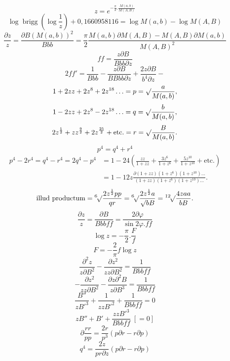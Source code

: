 \begin{equation*}\tag*{[2]}z=e^{-\frac\pi2.\frac{M(a,b)}{M(A,B)}}\end{equation*}
\begin{equation*}\tag*{[3]}
\log\operatorname{brigg}\left(\log\frac1z\right)+0{,}1660958116=\log M(a,b)-\log M(A,B)
\end{equation*}
{\small
\begin{equation*}\tag*{[4]}
\frac{\partial z}z=\frac{\partial B(M(a,b))^2}{Bbb}
=\frac\pi2\frac{M(a,b)\partial M(A,B)-M(A,B)\partial M(a,b)}{M(A,B)^2}
\end{equation*}}
\begin{equation*}\tag*{[5]}ff=\frac{z\partial B}{Bbb\partial z}\end{equation*}
\[2ff'=\frac1{Bbb}-\frac{z\partial B}{BBbb\partial z}+\frac{2z\partial B}{b^4\partial z}-\]
\[1+2zz+2z^8+2z^{18}\ldots=p=\surd\frac a{M(a,b)},\]
\[1-2zz+2z^8-2z^{18}\ldots=q=\surd\frac b{M(a,b)},\]
\[2z^{\frac12}+zz^{\frac92}+2z^{\frac{25}2}+\text{etc.}=r=\surd\frac B{M(a,b)}.\]
\[p^4=q^4+r^4\]
{\small
\[\begin{aligned}
p^4-2r^4=q^4-r^4=2q^4-p^4
&=1-24\left(\frac{zz}{1+zz}+\frac{3z^6}{1+z^6}+\frac{5z^{10}}{1+z^{10}}+\text{etc.}\right)\\
&=1-12z\frac{\partial(1+zz)(1+z^6)(1+z^{10})\ldots}{(1+zz)(1+z^6)(1+z^{10})\ldots}.
\end{aligned}\]}
\[\text{illud productum}={}^6\!\surd\frac{2z^{\frac12}pp}{qr}
={}^6\!\surd\frac{2z^{\frac12}a}{\surd bB}={} ^{12}\!\surd\frac{4zaa}{bB}.\]
\clearpage{}
\noindent [S.\ 12]
\begin{equation*}\tag*{[6]}\frac{\partial z}z=\frac{\partial B}{Bbbff}=\frac{2\partial\varphi}{\sin2\varphi.ff}\end{equation*}
\begin{equation*}\tag*{[7]}\log z=-\frac\pi2.\frac Ff\end{equation*}
\[F=-\frac2\pi f\log z\]
\[\frac{\partial^2z}{z\partial B^2}-\frac{\partial z^2}{zz\partial B^2}=\frac1{Bbbff}\]
\[-\frac{\partial z^2}{zz\partial B^2}-\frac{\partial z\partial^2B}{z\partial B^3}=\frac1{Bbbff}\]
\[\frac{B''}{zB'^3}+\frac1{zzB'^2}+\frac1{Bbbff}=0\]
\begin{equation*}\tag*{[8]}zB''+B'+\frac{zzB'^3}{Bbbff}\;[=0]\end{equation*}
\ClosingRule
\[\partial\frac{rr}{pp}=\frac{2r}{p^3}(p\partial r-r\partial p)\]
\[q^4=\frac{2z}{pr\partial z}(p\partial r-r\partial p)\]
